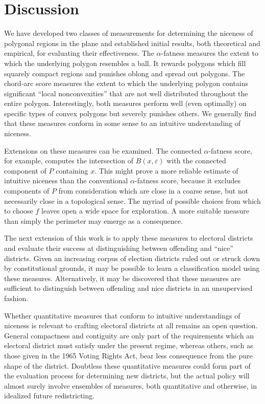 \documentclass[]{jocg}
\theoremstyle{definition}
\theoremstyle{remark}
\begin{document}
\section{Discussion}

We have developed two classes of measurements for determining the niceness of
polygonal regions in the plane and established initial results, both theoretical
and empirical, for evaluating their effectiveness. The $\alpha$-fatness measures
the extent to which the underlying polygon resembles a ball. It rewards
polygons which fill squarely compact regions and punishes oblong and spread out
polygons. The chord-arc score measures the extent to which the underlying
polygon contains significant ``local nonconvexities'' that are not well
distributed throughout the entire polygon. Interestingly, both measures perform
well (even optimally) on specific types of convex polygons but severely punishes
others. We generally find that these measures conform in some sense to an
intuitive understanding of niceness.

Extensions on these measures can be examined. The connected $\alpha$-fatness
score, for example, computes the intersection of $B(x,\varepsilon)$ with the
connected component of $P$ containing $x$. This might prove a more reliable
estimate of intuitive niceness than the conventional $\alpha$-fatness score,
because it excludes components of $P$ from consideration which are close in a
coarse sense, but not necessarily close in a topological sense. The myriad of
possible choices from which to choose $f$ leaves open a wide space for
exploration. A more suitable measure than simply the perimeter may emerge as a
consequence.

The next extension of this work is to apply these measures to electoral
districts and evaluate their success at distinguishing between offending and
``nice'' districts. Given an increasing corpus of election districts ruled out
or struck down by constitutional grounds, it may be possible to learn a
classification model using these measures. Alternatively, it may be discovered
that these measures are sufficient to distinguish between offending and nice
districts in an unsupervised fashion.

Whether quantitative measures that conform to intuitive understandings of
niceness is relevant to crafting electoral districts at all remains an open
question. General compactness and contiguity are only part of the requirements
which an electoral district must satisfy under the present regime, whereas
others, such as those given in the 1965 Voting Rights Act, bear less consequence
from the pure shape of the district. Doubtless these quantitative measures could
form part of the evaluation process for determining new districts, but the
actual policy will almost surely involve ensembles of measures, both
quantitative and otherwise, in idealized future redistricting.


\printbibliography[heading=bibintoc]
\end{document}

